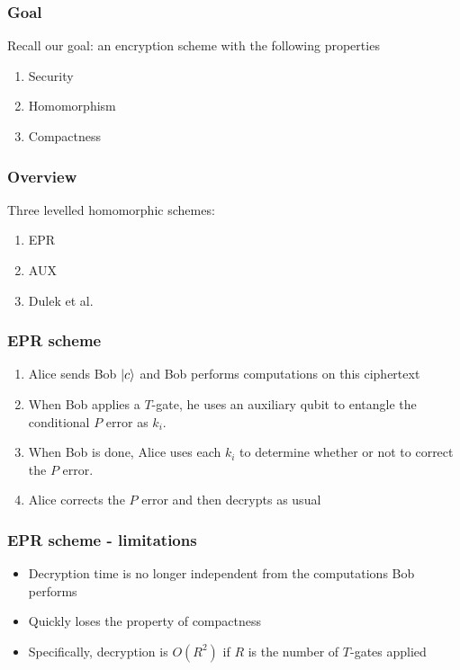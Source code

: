 




 \begin{frame}
\frametitle{Goal}
  Recall our goal: an encryption scheme with the following properties \pause
    \begin{enumerate}
    \item Security \pause
    \item Homomorphism \pause
    \item Compactness
   \end{enumerate}
\end{frame}
 
 \begin{frame}
\frametitle{Overview}
Three levelled homomorphic schemes: 
\begin{enumerate}
  \item EPR
  \item AUX
  \item Dulek et al. 
\end{enumerate}
\end{frame}
 
\begin{frame}
\frametitle{EPR scheme}
\begin{enumerate}
   \item Alice sends Bob $\left\vert{c}\right\rangle$ and Bob performs computations on this ciphertext
   \item When Bob applies a $T$-gate, he uses an auxiliary qubit to entangle the conditional $P$ error as $k_i$. 
   \item When Bob is done, Alice uses each $k_i$ to determine whether or not to correct the $P$ error. 
   \item Alice corrects the $P$ error and then decrypts as usual
\end{enumerate}
\end{frame}

 \begin{frame}
\frametitle{EPR scheme - limitations}
\begin{itemize}
  \item Decryption time is no longer independent from the computations Bob performs
  \item Quickly loses the property of compactness
  \item Specifically, decryption is $O(R^2)$ if $R$ is the number of $T$-gates applied
  \end{itemize}
\end{frame}
 
